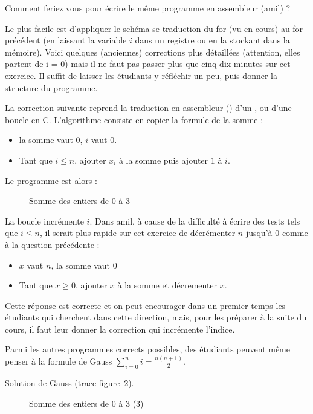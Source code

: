Comment feriez vous pour écrire le même programme en assembleur (amil)
?
\begin{correction}
Le plus facile est d'appliquer le schéma se traduction du for (vu en
cours) au for
précédent (en laissant la variable $i$ dans un registre ou en la
stockant dans la mémoire).  Voici quelques (anciennes) corrections
plus détaillées (attention, elles partent de i = 0) mais il ne faut pas passer plus que cinq-dix minutes
sur cet exercice. Il suffit de laisser les étudiants y réfléchir un peu, puis
donner la structure du programme.

La correction suivante reprend la traduction en assembleur () d'un , ou d'une boucle  en C. L'algorithme consiste en copier la formule de
la somme :
\begin{itemize}
\item la somme vaut $0$,  $i$ vaut $0$.
\item Tant que $i \leq n$, ajouter $x_i$ à la somme puis ajouter $1$ à
  $i$.
\end{itemize}

Le programme est alors :

\begin{figure}[tbp]
  \centering 
  \caption{Somme des entiers de $0$ à $3$}
  \label{fig:gauss1}
\end{figure}


La boucle incrémente $i$. Dans amil, à cause de la difficulté à écrire
des tests tels que $i \leq n$, il serait plus rapide sur cet exercice
de décrémenter $n$ jusqu'à $0$ comme à la question précédente :

\begin{itemize}
\item $x$ vaut $n$, la somme vaut $0$
\item Tant que $x \geq 0$, ajouter $x$ à la somme et décrementer $x$.
\end{itemize}

Cette réponse est correcte et on peut encourager dans un premier temps
les étudiants qui cherchent dans cette direction, mais, pour les
préparer à la suite du cours, il faut leur donner la correction qui
incrémente l'indice.

Parmi les autres programmes corrects possibles, des étudiants peuvent
même penser à la formule de Gauss $\sum^n_{i = 0} i = \frac{n (n +
  1)}{2}$. 


Solution de Gauss (trace figure~\ref{fig:gauss3}).

    \begin{figure}[tbp]
      \centering
      
      \caption{Somme des entiers de $0$ à $3$ (3)}
      \label{fig:gauss3}
    \end{figure}
\end{correction}




